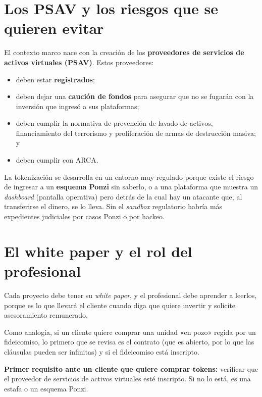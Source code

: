 \documentclass[12pt,oneside]{book}
\begin{document}
\section{Los PSAV y los riesgos que se quieren evitar}

El contexto marco nace con la creación de los \textbf{proveedores de servicios de activos virtuales (PSAV)}. Estos proveedores:

\begin{itemize}
    \item deben estar \textbf{registrados};
    \item deben dejar una \textbf{caución de fondos} para asegurar que no se fugarán con la inversión que ingresó a sus plataformas;
    \item deben cumplir la normativa de prevención de lavado de activos, financiamiento del terrorismo y proliferación de armas de destrucción masiva; y
    \item deben cumplir con ARCA.
\end{itemize}

La tokenización se desarrolla en un entorno muy regulado porque existe el riesgo de ingresar a un \textbf{esquema Ponzi} sin saberlo, o a una plataforma que muestra un \textit{dashboard} (pantalla operativa) pero detrás de la cual hay un atacante que, al transferirse el dinero, se lo lleva. Sin el \textit{sandbox} regulatorio habría más expedientes judiciales por casos Ponzi o por hackeo.

\section{El white paper y el rol del profesional}

Cada proyecto debe tener su \textit{white paper}, y el profesional debe aprender a leerlos, porque es lo que llevará el cliente cuando diga que quiere invertir y solicite asesoramiento remunerado.

Como analogía, si un cliente quiere comprar una unidad «en pozo» regida por un fideicomiso, lo primero que se revisa es el contrato (que es abierto, por lo que las cláusulas pueden ser infinitas) y si el fideicomiso está inscripto.

\begin{important}
\textbf{Primer requisito ante un cliente que quiere comprar tokens:} verificar que el proveedor de servicios de activos virtuales esté inscripto. Si no lo está, es una estafa o un esquema Ponzi.
\end{important}
\end{document}
